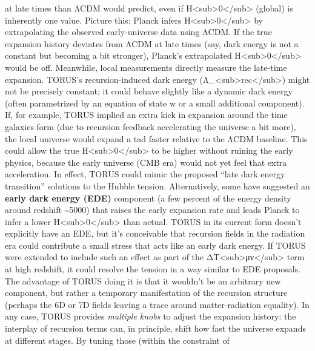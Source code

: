 \documentclass[]{article}
\begin{document}
\begin{enumerate}
  at late times than ΛCDM would predict, even if
  H\textless{}sub\textgreater{}0\textless{}/sub\textgreater{} (global)
  is inherently one value. Picture this: Planck infers
  H\textless{}sub\textgreater{}0\textless{}/sub\textgreater{} by
  extrapolating the observed early-universe data using ΛCDM. If the true
  expansion history deviates from ΛCDM at late times (say, dark energy
  is not a constant but becoming a bit stronger), Planck's extrapolated
  H\textless{}sub\textgreater{}0\textless{}/sub\textgreater{} would be
  off. Meanwhile, local measurements directly measure the late-time
  expansion. TORUS's recursion-induced dark energy
  (Λ\_\textless{}sub\textgreater{}rec\textless{}/sub\textgreater{})
  might not be precisely constant; it could behave slightly like a
  dynamic dark energy (often parametrized by an equation of state w or a
  small additional component). If, for example, TORUS implied an extra
  kick in expansion around the time galaxies form (due to recursion
  feedback accelerating the universe a bit more), the local universe
  would expand a tad faster relative to the ΛCDM baseline. This could
  allow the true
  H\textless{}sub\textgreater{}0\textless{}/sub\textgreater{} to be
  higher without ruining the early physics, because the early universe
  (CMB era) would not yet feel that extra acceleration. In effect, TORUS
  could mimic the proposed ``late dark energy transition'' solutions to
  the Hubble tension. Alternatively, some have suggested an
  \textbf{early dark energy (EDE)} component (a few percent of the
  energy density around redshift \textasciitilde{}5000) that raises the
  early expansion rate and leads Planck to infer a lower
  H\textless{}sub\textgreater{}0\textless{}/sub\textgreater{} than
  actual. TORUS in its current form doesn't explicitly have an EDE, but
  it's conceivable that recursion fields in the radiation era could
  contribute a small stress that acts like an early dark energy. If
  TORUS were extended to include such an effect as part of the
  ΔT\textless{}sub\textgreater{}μν\textless{}/sub\textgreater{} term at
  high redshift, it could resolve the tension in a way similar to EDE
  proposals​. The advantage of TORUS doing it is that it wouldn't be an
  arbitrary new component, but rather a temporary manifestation of the
  recursion structure (perhaps the 6D or 7D fields leaving a trace
  around matter-radiation equality). In any case, TORUS provides
  \emph{multiple knobs} to adjust the expansion history: the interplay
  of recursion terms can, in principle, shift how fast the universe
  expands at different stages. By tuning those (within the constraint of

\end{enumerate}
\end{document}

